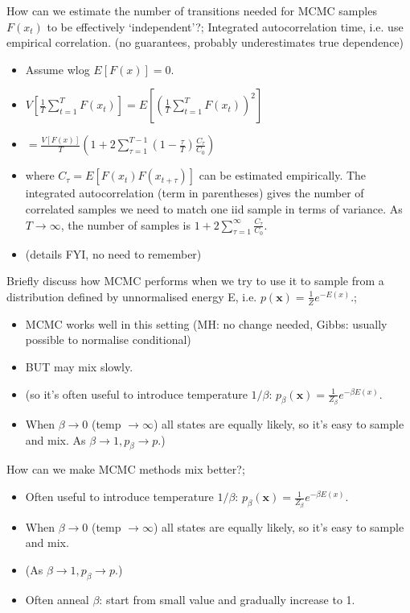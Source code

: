 \documentclass{article}
\begin{document}
How can we estimate the number of transitions needed for MCMC samples $F(x_t)$ to be effectively `independent'?; Integrated autocorrelation time, i.e. use empirical correlation. (no guarantees, probably underestimates true dependence) \begin{itemize} \item Assume wlog $E[F(x)] = 0$. \item $V[\frac{1}{T}\sum_{t=1}^T F(x_t)] = E[(\frac{1}{T}\sum_{t=1}^TF(x_t))^2]$ \item $=\frac{V[F(x)]}{T}(1+2\sum_{\tau = 1}^{T-1}(1-\frac{\tau}{T})\frac{C_\tau}{C_0})$ \item where $C_\tau = E[F(x_t)F(x_{t+\tau})]$ can be estimated empirically. The integrated autocorrelation (term in parentheses) gives the number of correlated samples we need to match one iid sample in terms of variance. As $T\rightarrow\infty$, the number of samples is $1+2\sum_{\tau=1}^\infty \frac{C_\tau}{C_0}$. \item (details FYI, no need to remember) \end{itemize}

Briefly discuss how MCMC performs when we try to use it to sample from a distribution defined by unnormalised energy E, i.e. $p(\mathbf{x}) = \frac{1}{Z}e^{-E(x)}$.; \begin{itemize} \item MCMC works well in this setting (MH: no change needed, Gibbs: usually possible to normalise conditional) \item BUT may mix slowly. \item (so it's often useful to introduce temperature $1/\beta$: $p_\beta(\mathbf{x}) = \frac{1}{Z_{\beta}}e^{-\beta E(x)}$. \item When $\beta\rightarrow 0$ (temp $\rightarrow\infty$) all states are equally likely, so it's easy to sample and mix. As $\beta\rightarrow1, p_\beta\rightarrow p$.) \end{itemize}

How can we make MCMC methods mix better?; \begin{itemize} \item Often useful to introduce temperature $1/\beta$: $p_\beta(\mathbf{x}) = \frac{1}{Z_{\beta}}e^{-\beta E(x)}$. \item When $\beta\rightarrow 0$ (temp $\rightarrow\infty$) all states are equally likely, so it's easy to sample and mix.  \item (As $\beta\rightarrow1, p_\beta\rightarrow p$.) \item Often anneal $\beta$: start from small value and gradually increase to 1. \end{itemize}
\end{document}
